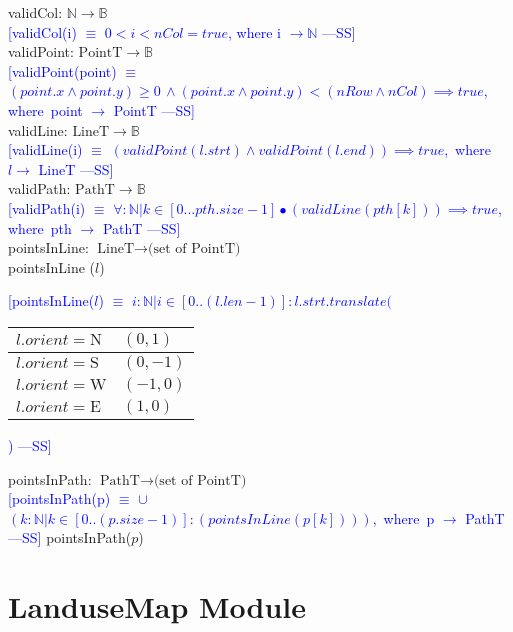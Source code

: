 \documentclass[12pt]{article}
\newcommand{\authornote}[3]{\textcolor{#1}{[#3 ---#2]}}
\newcommand{\authornote}[3]{}
\newcommand{\wss}[1]{\authornote{blue}{SS}{#1}}
\begin{document}
\noindent validCol: $\mathbb{N} \rightarrow \mathbb{B}$\\
\noindent \wss{validCol(i) $\equiv$ $0 < i < nCol = true$, where i $\rightarrow \mathbb{N}$}\\

\noindent validPoint: $\mbox{PointT} \rightarrow \mathbb{B}$\\
\noindent \wss{validPoint(point) $\equiv$ $(point.x \land point.y) \geq 0\, \land (point.x \land point.y) < (nRow \land nCol) \implies true$,\, where\, point $\rightarrow$ PointT}\\

\noindent validLine: $\mbox{LineT} \rightarrow \mathbb{B}$\\
\noindent \wss{validLine(i) $\equiv$ $(validPoint(l.strt) \land validPoint(l.end))  \implies true$,\, where\, $l \rightarrow$ LineT}\\

\noindent validPath: $\mbox{PathT} \rightarrow \mathbb{B}$\\
\noindent \wss{validPath(i) $\equiv$ $\forall : \mathbb{N} | k \in [0...pth.size - 1] \bullet (validLine(pth[k])) \implies true$,\, where\, pth $\rightarrow$ PathT}\\

\noindent pointsInLine: $\mbox{LineT} \rightarrow \mbox{(set of PointT)}$\\
\noindent pointsInLine ($l$) 
\wss{pointsInLine($l$) $\equiv$  $i: \mathbb{N} | i \in [0 .. (l.len - 1)] : l.strt.translate($ \begin{tabular}{|l|l|}
\hline
$l.orient = \mbox{N}$ & $(0,1)$\\
\hline
$l.orient = \mbox{S}$ & $(0,-1)$\\
\hline
$l.orient = \mbox{W}$ & $(-1,0)$\\
\hline
$l.orient = \mbox{E}$ & $(1,0)$\\
\hline
\end{tabular})}

\noindent pointsInPath: $\mbox{PathT} \rightarrow \mbox{(set of PointT)}$\\
\wss{pointsInPath(p) $\equiv$ $\cup$$(k: \mathbb{N} | k \in [0 .. (p.size - 1)] : (pointsInLine(p[k])))$,\, where\, p $\rightarrow$ PathT}
\noindent pointsInPath($p$) 

\newpage

\section* {LanduseMap Module}
\end{document}
